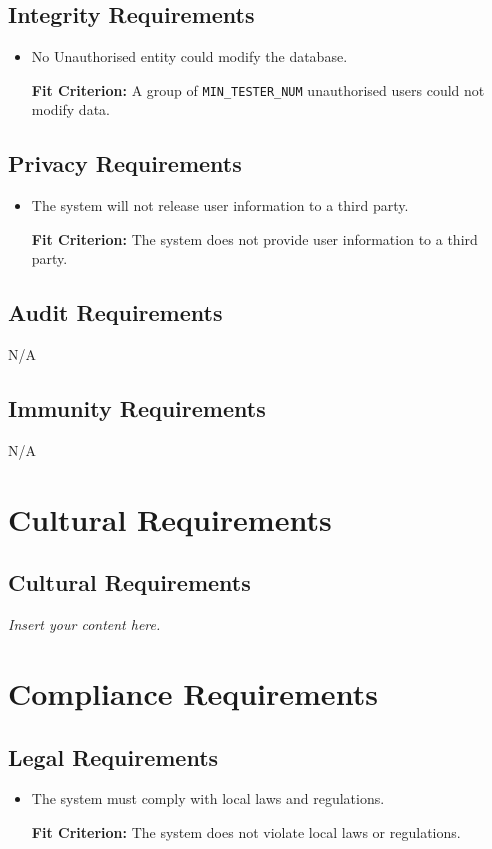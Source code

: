 \documentclass[12pt]{article}
\newcommand{\lips}{\textit{Insert your content here.}}
\newcounter{nfrnum} %
\newcommand{\rthenfrnum}{NFR\refstepcounter{nfrnum}\thenfrnum:}
\begin{document}
\subsection{Integrity Requirements}
\begin{itemize}
\item[\rthenfrnum]
No Unauthorised entity could modify the database.

\textbf{Fit Criterion:} A group of \texttt{MIN\_TESTER\_NUM} unauthorised users could not modify data.
\end{itemize}
\subsection{Privacy Requirements}
\begin{itemize}
\item[\rthenfrnum]
The system will not release user information to a third party.

\textbf{Fit Criterion:} The system does not provide user information to a third party.
\end{itemize}
\subsection{Audit Requirements}
N/A
\subsection{Immunity Requirements}
N/A

\section{Cultural Requirements}
\subsection{Cultural Requirements}
\lips

\section{Compliance Requirements}
\subsection{Legal Requirements}
\begin{itemize}
\item[\rthenfrnum]
The system must comply with local laws and regulations.

\textbf{Fit Criterion:} The system does not violate local laws or regulations.
\end{itemize}
\end{document}
